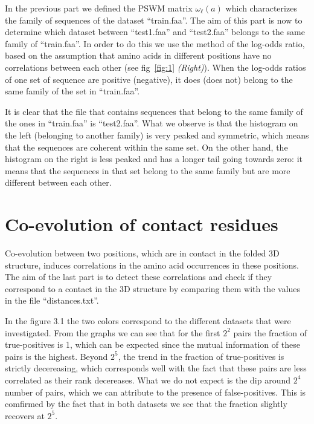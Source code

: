 \documentclass[paper=a4, fontsize=10pt]{article} %
\numberwithin{equation}{section} %
\numberwithin{figure}{section} %
\numberwithin{table}{section} %
\begin{document}

In the previous part we defined the PSWM matrix $\omega_{\ell}(a)$ which characterizes the family of sequences of the dataset ``train.faa''.
The aim of this part is now to determine which dataset between ``test1.faa'' and ``test2.faa'' belongs to the same family of ``train.faa''.
In order to do this we use the method of the log-odds ratio, based on the assumption that amino acids in different positions have no correlations between each other (see fig~\ref{fig:1} \emph{(Right)}). When the log-odds ratios of one set of sequence are positive (negative), it does (does not) belong to the same family of the set in ``train.faa''. 

It is clear that the file that contains sequences that belong to the same family of the ones in ``train.faa'' is ``test2.faa''. What we observe is that the histogram on the left (belonging to another family) is very peaked and symmetric, which means that the sequences are coherent within the same set. On the other hand, the histogram on the right is less peaked and has a longer tail going towards zero: it means that the sequences in that set belong to the same family but are more different between each other.






\section{\textbf{Co-evolution of contact residues}}



Co-evolution between two positions, which are in contact in the folded 3D structure, induces correlations in the amino acid occurrences in these positions. The aim of the last part is to detect these correlations and check if they correspond to a contact in the 3D structure by comparing them with the values in the file ``distances.txt''.

In the figure 3.1 the two colors correspond to the different datasets that were investigated.
From the graphs we can see that for the first $2^2$ pairs the fraction of true-positives is 1, which can be expected since the mutual information of these pairs
is the highest. Beyond $2^5$, the trend in the fraction of true-positives is strictly decereasing, which corresponds well with the fact that these pairs are less
correlated as their rank decereases. What we do not expect is the dip around $2^4$ number of pairs, which we can attribute to the presence of false-positives.
This is comfirmed by the fact that in both datasets we see that the fraction slightly recovers at $2^5$. 
\end{document}
